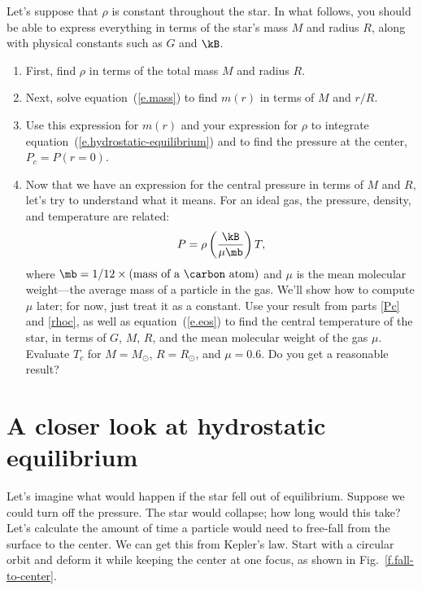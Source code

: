 \begin{exercisebox}
\label{ex.constant-density-star}
Let's suppose that $\rho$ is constant throughout the star. 
In what follows, you should be able to express everything in terms of the star's mass $M$ and radius $R$, along with physical constants such as $G$ and $\kB$.

\begin{enumerate}
\item\label{rhoc} First, find $\rho$ in terms of the total mass $M$ and radius $R$.

\item Next, solve equation~(\ref{e.mass}) to find $m(r)$ in terms of $M$ and $r/R$.

\item\label{Pc} Use this expression for $m(r)$ and your expression for $\rho$ to integrate equation~(\ref{e.hydrostatic-equilibrium}) and to find the pressure at the center, $P_{c} = P(r=0)$.

\item
Now that we have an expression for the central pressure in terms of $M$ and $R$, let's try to understand what it means. For an ideal gas, the pressure, density, and temperature are related:
\begin{equation}\label{e.eos}
P = \rho\left(\frac{\kB}{\mu\mb}\right) T,
\end{equation}
where $\mb = 1/12\times(\textrm{mass of a \carbon\ atom})$ and $\mu$ is the mean molecular weight---the average mass of a particle in the gas.  We'll show how to compute $\mu$ later; for now, just treat it as a constant. Use your result from parts \ref{Pc} and \ref{rhoc}, as well as equation~(\ref{e.eos}) to find the central temperature of the star, in terms of $G$, $M$, $R$, and the mean molecular weight of the gas $\mu$.  Evaluate $T_{c}$ for $M=M_{\odot}$, $R=R_{\odot}$, and $\mu = 0.6$.  Do you get a reasonable result?
\end{enumerate}
\end{exercisebox}

\section{A closer look at hydrostatic equilibrium}
\label{s.closer-look}

Let's imagine what would happen if the star fell out of equilibrium.  Suppose we could turn off the pressure.  The star would collapse; how long would this take?  Let's calculate the amount of time a particle would need to free-fall from the surface to the center.  We can get this from Kepler's law. Start with a circular orbit and deform it while keeping the center at one focus, as shown in Fig.~\ref{f.fall-to-center}.  

